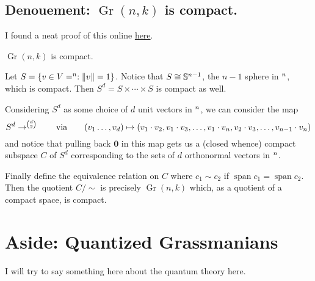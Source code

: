 \documentclass[12pt]{article}
\DeclareMathOperator{\Gr}{Gr}
\let\k\relax
\newcommand{\k}{\mathbbm{k}}
\begin{document}
\subsection{Denouement: \texorpdfstring{$\Gr(n,k)$}{Gr(n,k)} is compact.}
I found a neat proof of this online \href{https://math.stackexchange.com/questions/148088/compactness-of-the-grassmannian}{here}.
\begin{prop}
	$\Gr(n,k)$ is compact.
\end{prop}
\begin{prf}
	Let $S=\{v\in V=\k^n: \|v\|=1\}$. Notice that $S\cong \mathbb{S}^{n-1}$, the $n-1$ sphere in $\k^n$, which is compact. Then $S^d=S\times \cdots\times S$ is compact as well.

	Considering $S^d$ as some choice of $d$ unit vectors in $\k^n$, we can consider the map 
	\[S^d\to\k^{\binom{d}{2}}\qquad\text{via}\qquad (v_1\dots,v_d)\mapsto (v_1\cdot v_2,v_1\cdot v_3,\dots,v_1\cdot v_n,v_2\cdot v_3,\dots,v_{n-1}\cdot v_n)\]
	and notice that pulling back $\mathbf 0$ in this map gets us a (closed whence) compact subspace $C$ of $S^d$ corresponding to the 
	sets of $d$ orthonormal vectors in $\k^n$.

	Finally define the equivalence relation on $C$ where $c_1\sim c_2$ if $\operatorname{span} c_1=\operatorname{span} c_2$. Then the quotient 
	$C/\sim$ is precisely $\Gr(n,k)$ which, as a quotient of a compact space, is compact.
\end{prf}

\section{Aside: Quantized Grassmanians}
I will try to say something here about the quantum theory here.

\medskip

\printbibliography
\end{document}
